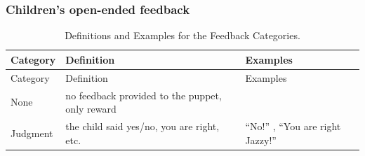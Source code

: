 \documentclass[oneside]{report}
\theoremstyle{definition}
\theoremstyle{definition}
\theoremstyle{definition}
\theoremstyle{remark}
\begin{document}
\subsubsection{Children's open-ended
feedback}\label{childrens-open-ended-feedback}
\begin{longtable}[]{@{}lll@{}}
\caption{\label{tab:feedbackCat} Definitions and Examples for the Feedback
Categories.}\tabularnewline
\toprule
\begin{minipage}[b]{0.11\columnwidth}\raggedright\strut
Category\strut
\end{minipage} & \begin{minipage}[b]{0.46\columnwidth}\raggedright\strut
Definition\strut
\end{minipage} & \begin{minipage}[b]{0.32\columnwidth}\raggedright\strut
Examples\strut
\end{minipage}\tabularnewline
\midrule
\endfirsthead
\toprule
\begin{minipage}[b]{0.11\columnwidth}\raggedright\strut
Category\strut
\end{minipage} & \begin{minipage}[b]{0.46\columnwidth}\raggedright\strut
Definition\strut
\end{minipage} & \begin{minipage}[b]{0.32\columnwidth}\raggedright\strut
Examples\strut
\end{minipage}\tabularnewline
\midrule
\endhead
\begin{minipage}[t]{0.11\columnwidth}\raggedright\strut
None\strut
\end{minipage} & \begin{minipage}[t]{0.46\columnwidth}\raggedright\strut
no feedback provided to the puppet, only reward\strut
\end{minipage} & \begin{minipage}[t]{0.32\columnwidth}\raggedright\strut
\strut
\end{minipage}\tabularnewline
\begin{minipage}[t]{0.11\columnwidth}\raggedright\strut
Judgment\strut
\end{minipage} & \begin{minipage}[t]{0.46\columnwidth}\raggedright\strut
the child said yes/no, you are right, etc.\strut
\end{minipage} & \begin{minipage}[t]{0.32\columnwidth}\raggedright\strut
``No!'' , ``You are right Jazzy!''\strut
\end{minipage}\tabularnewline

\end{longtable}
\end{document}
